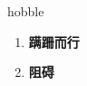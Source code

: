 
\begin{frame}
{\huge hobble}
\begin{center}
\begin{enumerate}\Large
  \item \textbf{蹒跚而行}
  \item \textbf{阻碍}
\end{enumerate}
\end{center}
\end{frame}
